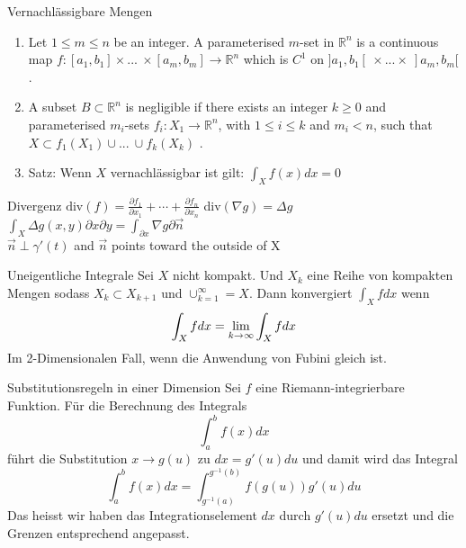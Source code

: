 \begin{Definition}{Vernachlässigbare Mengen}{}
    \begin{enumerate}
        \def\labelenumi{\arabic{enumi}.}
        \item
          Let \(1\leq m \leq n\) be an integer. A parameterised \(m\)-set in
          \(\mathbb{R}^n\) is a continuous map
          \(f:[a_1,b_1]\times ...\ \times[a_m,b_m] \rightarrow \mathbb{R}^n\)
          which is \(C^1\) on \(]a_1, b_1[\ \times ... \times\ ]a_m,b_m[\).
        \item
          A subset \(B\subset \mathbb{R}^n\) is negligible if there exists an
          integer \(k \geq 0\) and parameterised \(m_i\)-sets
          \(f_i:X_1 \rightarrow \mathbb{R}^n\), with \(1\leq i \leq k\) and
          \(m_i < n\), such that \(X\subset f_1(X_1) \cup ...\ \cup f_k(X_k)\) .
        \item Satz: Wenn $X$ vernachlässigbar ist gilt:
            $\int_X f(x) dx = 0$
    \end{enumerate}
\end{Definition}

\begin{Definition}{Divergenz}{}
    $\text{div}(f) = \frac{\partial f_1}{\partial x_1} + \cdots + \frac{\partial f_n}{\partial x_n}$ \quad div$(\nabla g) = \Delta g$ \quad $\int_X \Delta g (x,y) \partial x \partial y = \int_{\partial x} \nabla g \partial \Vec{n}$\\
    $\Vec{n} \perp \gamma'(t)$ and $\Vec{n}$ points toward the outside of X
\end{Definition}
\begin{Definition}{Uneigentliche Integrale}{}
    Sei $X$ nicht kompakt. Und $X_k$ eine Reihe von kompakten Mengen sodass $X_k \subset X_{k+1}$ und
    $\cup_{k = 1}^{\infty} = X$. Dann konvergiert $\int_X f dx$ wenn
    \[
        \int_X f dx = \lim\limits_{k \to \infty}{\int_X f dx}
    \]
    Im 2-Dimensionalen Fall, wenn die Anwendung von Fubini gleich ist.
\end{Definition}

\begin{Satz}{Substitutionsregeln in einer Dimension}{}
    Sei $f$ eine Riemann-integrierbare Funktion. Für die Berechnung des Integrals
    \[
        \int_a^b f(x) dx
    \]
    führt die Substitution $x \to g(u)$ zu $dx = g'(u)du$ und damit wird das Integral
    \[
        \int_a^b f(x) dx = \int_{g^{-1}(a)}^{g^{-1}(b)} f(g(u)) g'(u) du
    \]
    Das heisst wir haben das Integrationselement $dx$ durch $g'(u)du$ ersetzt und die Grenzen entsprechend angepasst.
\end{Satz}

